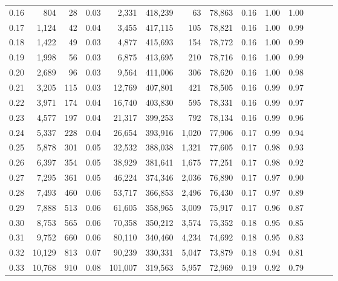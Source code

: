 \begin{tabular}{rrrrrrrrrrrrrr}
0.16 &     804 &     28 &  0.03 &    2,331 &  418,239 &      63 &  78,863 &  0.16 &  1.00 &      1.00 \\
0.17 &   1,124 &     42 &  0.04 &    3,455 &  417,115 &     105 &  78,821 &  0.16 &  1.00 &      0.99 \\
0.18 &   1,422 &     49 &  0.03 &    4,877 &  415,693 &     154 &  78,772 &  0.16 &  1.00 &      0.99 \\
0.19 &   1,998 &     56 &  0.03 &    6,875 &  413,695 &     210 &  78,716 &  0.16 &  1.00 &      0.99 \\
0.20 &   2,689 &     96 &  0.03 &    9,564 &  411,006 &     306 &  78,620 &  0.16 &  1.00 &      0.98 \\
0.21 &   3,205 &    115 &  0.03 &   12,769 &  407,801 &     421 &  78,505 &  0.16 &  0.99 &      0.97 \\
0.22 &   3,971 &    174 &  0.04 &   16,740 &  403,830 &     595 &  78,331 &  0.16 &  0.99 &      0.97 \\
0.23 &   4,577 &    197 &  0.04 &   21,317 &  399,253 &     792 &  78,134 &  0.16 &  0.99 &      0.96 \\
0.24 &   5,337 &    228 &  0.04 &   26,654 &  393,916 &   1,020 &  77,906 &  0.17 &  0.99 &      0.94 \\
0.25 &   5,878 &    301 &  0.05 &   32,532 &  388,038 &   1,321 &  77,605 &  0.17 &  0.98 &      0.93 \\
0.26 &   6,397 &    354 &  0.05 &   38,929 &  381,641 &   1,675 &  77,251 &  0.17 &  0.98 &      0.92 \\
0.27 &   7,295 &    361 &  0.05 &   46,224 &  374,346 &   2,036 &  76,890 &  0.17 &  0.97 &      0.90 \\
0.28 &   7,493 &    460 &  0.06 &   53,717 &  366,853 &   2,496 &  76,430 &  0.17 &  0.97 &      0.89 \\
0.29 &   7,888 &    513 &  0.06 &   61,605 &  358,965 &   3,009 &  75,917 &  0.17 &  0.96 &      0.87 \\
0.30 &   8,753 &    565 &  0.06 &   70,358 &  350,212 &   3,574 &  75,352 &  0.18 &  0.95 &      0.85 \\
0.31 &   9,752 &    660 &  0.06 &   80,110 &  340,460 &   4,234 &  74,692 &  0.18 &  0.95 &      0.83 \\
0.32 &  10,129 &    813 &  0.07 &   90,239 &  330,331 &   5,047 &  73,879 &  0.18 &  0.94 &      0.81 \\
0.33 &  10,768 &    910 &  0.08 &  101,007 &  319,563 &   5,957 &  72,969 &  0.19 &  0.92 &      0.79 \\

\end{tabular}
